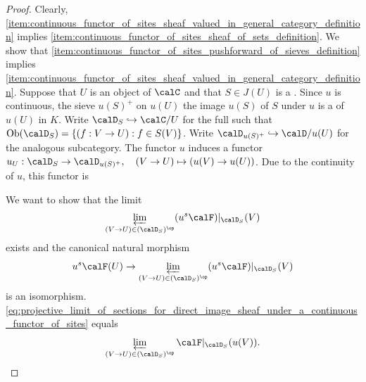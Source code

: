 \begin{proof}
    Clearly, \eqref{item:continuous_functor_of_sites_sheaf_valued_in_general_category_definition} implies \eqref{item:continuous_functor_of_sites_sheaf_of_sets_definition}. We show that \eqref{item:continuous_functor_of_sites_pushforward_of_sieves_definition} implies \eqref{item:continuous_functor_of_sites_sheaf_valued_in_general_category_definition}.
    Suppose that $U$ is an object of $\calC$ and that $S \in J(U)$ is a . Since $u$ is continuous, the sieve $u(S)^+$ on $u(U)$  the image $u(S)$ of $S$ under $u$ is a  of $u(U)$ in $K$. Write $\calD_S \hookrightarrow \calC/U$ for the full  such that $\operatorname{Ob}(\calD_S) = \{(f: V \to U): f \in S(V)\}$. Write $\calD_{u(S)^+} \hookrightarrow \calD/u(U)$ for the analogous subcategory. The functor $u$ induces a functor $u_U: \calD_S \to \calD_{u(S)^+}, \quad (V \to U) \mapsto (u(V) \to u(U))$. Due to the continuity of $u$, this functor is 

    We want to show that the limit
    \begin{align} \label{eq:projective_limit_of_sections_for_direct_image_sheaf_under_a_continuous_functor_of_sites}
    \varprojlim_{(V \to U) \in (\calD_S)^{\op}} (u^s \calF)|_{\calD_S}(V)
    \end{align}
    exists and the canonical natural morphism
    $$u^s \calF(U) \to \varprojlim_{(V \to U) \in (\calD_S)^{\op}} (u^s \calF)|_{\calD_S}(V)$$
    is an isomorphism. \eqref{eq:projective_limit_of_sections_for_direct_image_sheaf_under_a_continuous_functor_of_sites} equals
    $$ \varprojlim_{(V \to U) \in (\calD_S)^{\op}} \calF|_{\calD_S}(u(V)).$$


\end{proof}
